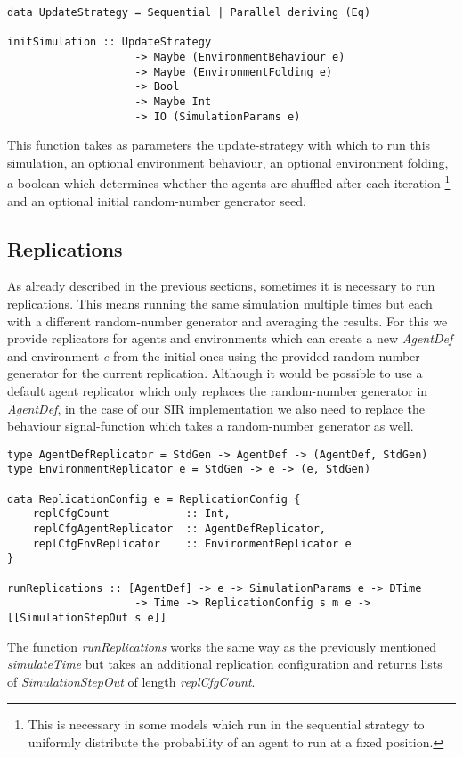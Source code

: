 \begin{verbatim}
data UpdateStrategy = Sequential | Parallel deriving (Eq)

initSimulation :: UpdateStrategy
                    -> Maybe (EnvironmentBehaviour e)
                    -> Maybe (EnvironmentFolding e)
                    -> Bool
                    -> Maybe Int
                    -> IO (SimulationParams e)
\end{verbatim}

This function takes as parameters the update-strategy with which to run this simulation, an optional environment behaviour, an optional environment folding, a boolean which determines whether the agents are shuffled after each iteration \footnote{This is necessary in some models which run in the sequential strategy to uniformly distribute the probability of an agent to run at a fixed position.} and an optional initial random-number generator seed.

\subsection{Replications}
As already described in the previous sections, sometimes it is necessary to run replications. This means running the same simulation multiple times but each with a different random-number generator and averaging the results. For this we provide replicators for agents and environments which can create a new \textit{AgentDef} and environment \textit{e} from the initial ones using the provided random-number generator for the current replication. Although it would be possible to use a default agent replicator which only replaces the random-number generator in \textit{AgentDef}, in the case of our SIR implementation we also need to replace the behaviour signal-function which takes a random-number generator as well.

\begin{verbatim}
type AgentDefReplicator = StdGen -> AgentDef -> (AgentDef, StdGen)
type EnvironmentReplicator e = StdGen -> e -> (e, StdGen)

data ReplicationConfig e = ReplicationConfig {
    replCfgCount            :: Int,
    replCfgAgentReplicator  :: AgentDefReplicator,
    replCfgEnvReplicator    :: EnvironmentReplicator e
}

runReplications :: [AgentDef] -> e -> SimulationParams e -> DTime
                    -> Time -> ReplicationConfig s m e -> [[SimulationStepOut s e]]
\end{verbatim}

The function \textit{runReplications} works the same way as the previously mentioned \textit{simulateTime} but takes an additional replication configuration and returns lists of \textit{SimulationStepOut} of length \textit{replCfgCount}.